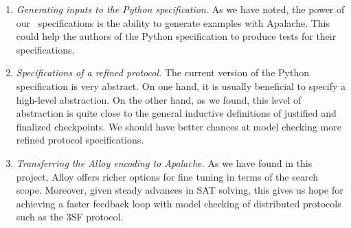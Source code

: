 
\begin{enumerate}

  \item \emph{Generating inputs to the Python specification.} As we have noted,
    the power of our~\tlap{} specifications is the ability to generate examples
    with Apalache. This could help the authors of the Python specification to
    produce tests for their specifications.

  \item \emph{Specifications of a refined protocol.} The current version of
    the Python specification is very abstract. On one hand, it is usually
    beneficial to specify a high-level abstraction. On the other hand, as we
    found, this level of abstraction is quite close to the general inductive
    definitions of justified and finalized checkpoints. We should have better
    chances at model checking more refined protocol specifications.

  \item \emph{Transferring the Alloy encoding to Apalache.} As we have found in
    this project, Alloy offers richer options for fine tuning in terms of the
    search scope. Moreover, given steady advances in SAT solving, this gives us
    hope for achieving a faster feedback loop with model checking of
    distributed protocols such as the 3SF protocol.

\end{enumerate}

